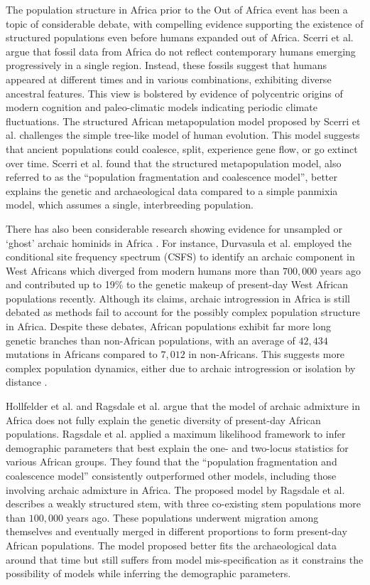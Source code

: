 The population structure in Africa prior to the Out of Africa event has been a topic of considerable debate, with compelling evidence supporting the existence of structured populations even before humans expanded out of Africa.
%
Scerri et al. \cite{scerri2019beyond} argue that fossil data from Africa do not reflect contemporary humans emerging progressively in a single region. Instead, these fossils suggest that humans appeared at different times and in various combinations, exhibiting diverse ancestral features. This view is bolstered by evidence of polycentric origins of modern cognition and paleo-climatic models indicating periodic climate fluctuations.
%
The structured African metapopulation model proposed by Scerri et al. challenges the simple tree-like model of human evolution. This model suggests that ancient populations could coalesce, split, experience gene flow, or go extinct over time. Scerri et al. found that the structured metapopulation model, also referred to as the ``population fragmentation and coalescence model'', better explains the genetic and archaeological data compared to a simple panmixia model, which assumes a single, interbreeding population.

There has also been considerable research showing evidence for unsampled or `ghost' archaic hominids in Africa \cite{ragsdale2019models,hammer2011genetic,lorente2019whole,durvasula2020recovering}. For instance, Durvasula et al. employed the conditional site frequency spectrum (CSFS) to identify an archaic component in West Africans which diverged from modern humans more than $700{,}000$ years ago and contributed up to 19\% to the genetic makeup of present-day West African populations recently. Although its claims, archaic introgression in Africa is still debated as methods fail to account for the possibly complex population structure in Africa.
%
Despite these debates, African populations exhibit far more long genetic branches than non-African populations, with an average of $42{,}434$ mutations in Africans compared to $7{,}012$ in non-Africans. This suggests more complex population dynamics, either due to archaic introgression or isolation by distance \cite{speidel2019method}.

Hollfelder et al. \cite{hollfelder2021deep} and Ragsdale et al. \cite{ragsdale2023weakly} argue that the model of archaic admixture in Africa does not fully explain the genetic diversity of present-day African populations. Ragsdale et al. applied a maximum likelihood framework to infer demographic parameters that best explain the one- and two-locus statistics for various African groups. They found that the ``population fragmentation and coalescence model'' \cite{scerri2019beyond} consistently outperformed other models, including those involving archaic admixture in Africa. The proposed model by Ragsdale et al. describes a weakly structured stem, with three co-existing stem populations more than $100{,}000$ years ago. These populations underwent migration among themselves and eventually merged in different proportions to form present-day African populations. The model proposed better fits the archaeological data around that time but still suffers from model mis-specification as it constrains the possibility of models while inferring the demographic parameters.

